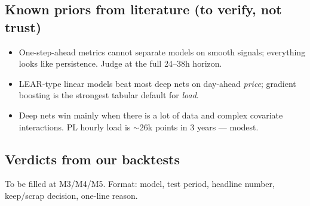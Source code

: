 \subsection{Known priors from literature (to verify, not trust)}

\begin{itemize}
  \item One-step-ahead metrics cannot separate models on smooth signals;
        everything looks like persistence. Judge at the full 24--38h horizon.
  \item LEAR-type linear models beat most deep nets on day-ahead \emph{price};
        gradient boosting is the strongest tabular default for \emph{load}.
  \item Deep nets win mainly when there is a lot of data and complex
        covariate interactions. PL hourly load is $\sim$26k points in 3 years ---
        modest.
\end{itemize}

\subsection{Verdicts from our backtests}

To be filled at M3/M4/M5. Format: model, test period, headline number,
keep/scrap decision, one-line reason.
